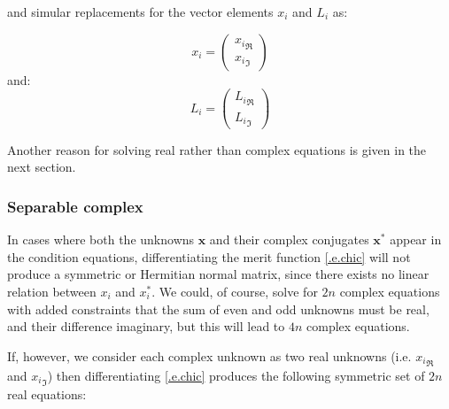 and simular replacements for the vector elements $x_{i}$ and $L_{i}$ as:

\begin{equation}
	x_{i}=\left( \begin{array} {r}
		     {x_{i}}_{\Re} \\
			{x_{i}}_{\Im}
		     \end{array} \right)
\end{equation}
and:
\begin{equation}
	L_{i}=\left( \begin{array} {r}
		     {L_{i}}_{\Re} \\
			{L_{i}}_{\Im}
		     \end{array} \right)
\end{equation}


Another reason for solving real rather than complex equations is given in the
next section.

\subsubsection{Separable complex}
\label{.ss.sepc}

In cases where both the unknowns $\mathbf{x}$ and their complex conjugates
$\mathbf{x}^{*}$ appear in the condition equations, differentiating the merit
function \eqref{.e.chic} will not produce a symmetric or Hermitian
normal matrix, since there exists no linear relation between $x_{i}$ and
$x^{*}_{i}$. We could, of course, solve for $2n$ complex equations with added
constraints that the sum of even and odd unknowns must be real, and their
difference imaginary, but this will lead to $4n$ complex equations.

If, however, we consider each complex unknown as two real unknowns (i.e.
${x_{i}}_{\Re}$ and ${x_{i}}_{\Im}$) then differentiating \eqref{.e.chic}
produces the
following symmetric set of $2n$ real equations:

